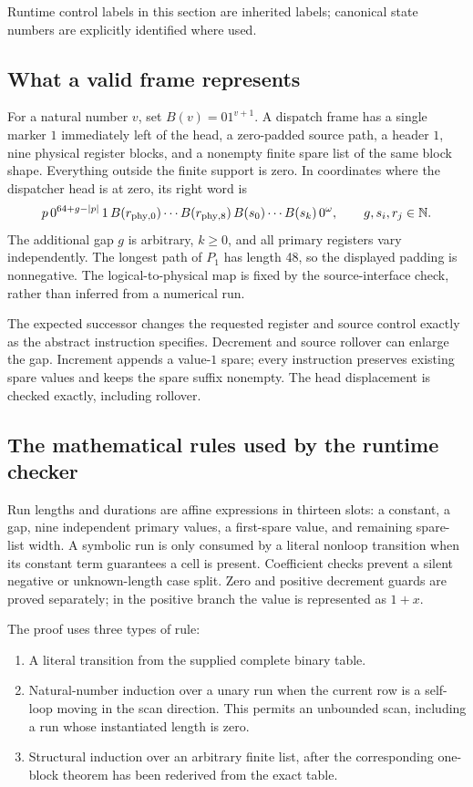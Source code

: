 \documentclass[11pt,letterpaper]{article}
\theoremstyle{definition}\newtheorem{definition}[theorem]{Definition}
\begin{document}
Runtime control labels in this section are inherited labels; canonical
state numbers are explicitly identified where used.

\subsection{What a valid frame represents}

For a natural number $v$, set $B(v)=01^{v+1}$.  A dispatch frame has a
single marker $1$ immediately left of the head, a zero-padded source path,
a header $1$, nine physical register blocks, and a nonempty finite spare
list of the same block shape.  Everything outside the finite support is
zero.  In coordinates where the dispatcher head is at zero, its right
word is
\[
 p\,0^{64+g-|p|}\,1\,
 B(r_{\rm phy,0})\cdots B(r_{\rm phy,8})\,
 B(s_0)\cdots B(s_k)\,0^\omega,
 \qquad g,s_i,r_j\in\mathbb N.
\]
The additional gap $g$ is arbitrary, $k\geq0$, and all primary registers
vary independently.  The longest path of $P_1$ has length 48, so the
displayed padding is nonnegative.  The logical-to-physical map is fixed
by the source-interface check, rather than inferred from a numerical run.

The expected successor changes the requested register and source control
exactly as the abstract instruction specifies.  Decrement and source
rollover can enlarge the gap.  Increment appends a value-$1$ spare; every
instruction preserves existing spare values and keeps the spare suffix
nonempty.  The head displacement is checked exactly, including rollover.

\subsection{The mathematical rules used by the runtime checker}

Run lengths and durations are affine expressions in thirteen slots:
a constant, a gap, nine independent primary values, a first-spare value,
and remaining spare-list width.  A symbolic run is only consumed by a
literal nonloop transition when its constant term guarantees a cell is
present.  Coefficient checks prevent a silent negative or unknown-length
case split.  Zero and positive decrement guards are proved separately;
in the positive branch the value is represented as $1+x$.

The proof uses three types of rule:
\begin{enumerate}
\item A literal transition from the supplied complete binary table.
\item Natural-number induction over a unary run when the current row is
a self-loop moving in the scan direction.  This permits an unbounded
scan, including a run whose instantiated length is zero.
\item Structural induction over an arbitrary finite list, after the
corresponding one-block theorem has been rederived from the exact table.
\end{enumerate}
\end{document}
